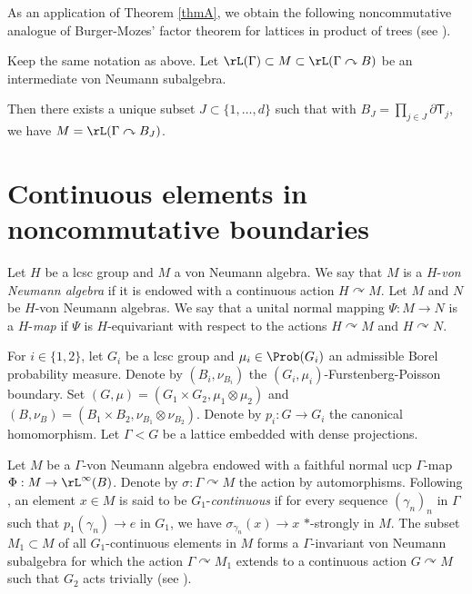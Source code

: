 As an application of Theorem \ref{thmA}, we obtain the following noncommutative analogue of Burger-Mozes'\! factor theorem for lattices in product of trees (see \cite[Th.\,4.6]{BM00b}).

\begin{letterthm}\label{thmC}
Keep the same notation as above. Let $\rL(\Gamma) \subset M \subset \rL(\Gamma \curvearrowright B)$ be an intermediate von Neumann subalgebra.

Then there exists a unique subset $J \subset \{1, \dots, d\}$ such that with $B_J = \prod_{j \in J} \partial \mathsf T_j$, we have $M = \rL(\Gamma \curvearrowright B_J)$.
\end{letterthm}

\section{Continuous elements in noncommutative boundaries}

Let $H$ be a lcsc group and $M$ a von Neumann algebra. We say that $M$ is a $H$-\emph{von Neumann algebra} if it is endowed with a continuous action $H \curvearrowright M$. Let $M$ and $N$ be $H$-von Neumann algebras. We say that a unital normal mapping $\Psi : M \to N$ is a $H$-\emph{map} if $\Psi$ is $H$-equivariant with respect to the actions $H \curvearrowright M$ and $H \curvearrowright N$.

For $i \in \{1, 2\}$, let $G_i$ be a lcsc group and $\mu_i \in \Prob(G_i)$ an admissible Borel probability measure. Denote by $(B_i, \nu_{B_i})$ the $(G_i, \mu_i)$-Furstenberg-Poisson boundary. Set $(G, \mu) = (G_1 \times G_2, \mu_1 \otimes \mu_2)$ and $(B, \nu_B) = (B_1 \times B_2, \nu_{B_1} \otimes \nu_{B_2})$. Denote by $p_i : G \to G_i$ the canonical homomorphism. Let $\Gamma < G$ be a lattice embedded with dense projections.

Let $M$ be a $\Gamma$-von Neumann algebra endowed with a faithful normal ucp $\Gamma$-map $\Phi : M \to \rL^\infty(B)$. Denote by $\sigma : \Gamma \curvearrowright M$ the action by automorphisms. Following \cite[Def.\,5.3]{BBHP20}, an element $x \in M$ is said to be $G_1$-\emph{continuous} if for every sequence $(\gamma_n)_n$ in $\Gamma$ such that $p_1(\gamma_n) \to e$ in $G_1$, we have $\sigma_{\gamma_n}(x) \to x$ $\ast$-strongly in $M$. The subset $M_1 \subset M$ of all $G_1$-continuous elements in $M$ forms a $\Gamma$-invariant von Neumann subalgebra for which the action $\Gamma \curvearrowright M_1$ extends to a continuous action $G \curvearrowright M$ such that $G_2$ acts trivially (see \cite[Th.\,5.5]{BBHP20}).


